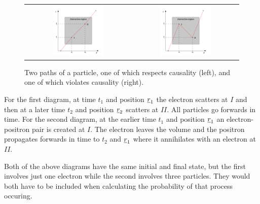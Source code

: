 \begin{figure}[!htb]
  \begin{center}
    \begin{tabular}{cc}
      \includegraphics[width=0.5\textwidth]{images/chapter_5/path1.pdf} &
      \includegraphics[width=0.5\textwidth]{images/chapter_5/path2.pdf} \\
    \end{tabular}
    \caption[A causal and a non-causal path of a particle]{Two paths of a particle, one of which respects causality (left), and one of which violates causality (right).}
    \label{fig:ch5_paths}
  \end{center}
\end{figure}

For the first diagram, at time $t_1$ and position $\underline{r}_1$ the electron scatters at $I$ and then at a later time $t_2$ and position $\underline{r}_2$ scatters at $II$.  All particles go forwards in time.  For the second diagram, at the earlier time $t_1$ and position $\underline{r}_1$ an electron-positron pair is created at $I$.  The electron leaves the volume and the positron propagates forwards in time to $t_2$ and $\underline{r}_1$ where it annihilates with an electron at $II$.

Both of the above diagrams have the same initial and final state, but the first involves just one electron while the second involves three particles.  They would both have to be included when calculating the probability of that process occuring.
